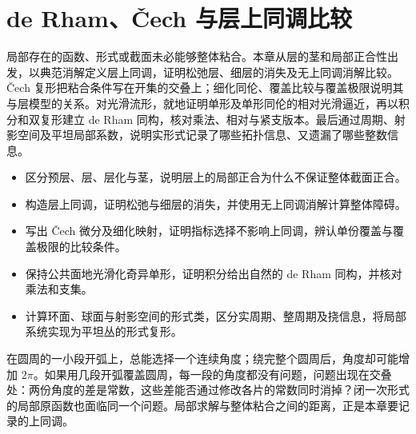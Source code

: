 
% 
% 

\chapter{de Rham、Čech 与层上同调比较}
\label{g2:ch:07}

\begin{chapterabstract}
	局部存在的函数、形式或截面未必能够整体粘合。本章从层的茎和局部正合性出发，以典范消解定义层上同调，证明松弛层、细层的消失及无上同调消解比较。Čech 复形把粘合条件写在开集的交叠上；细化同伦、覆盖比较与覆盖极限说明其与层模型的关系。对光滑流形，就地证明单形及单形同伦的相对光滑逼近，再以积分和双复形建立 de Rham 同构，核对乘法、相对与紧支版本。最后通过周期、射影空间及平坦局部系数，说明实形式记录了哪些拓扑信息、又遗漏了哪些整数信息。
\end{chapterabstract}

\begin{learninggoals}
	\begin{itemize}
		\item 区分预层、层、层化与茎，说明层上的局部正合为什么不保证整体截面正合。
		\item 构造层上同调，证明松弛与细层的消失，并使用无上同调消解计算整体障碍。
		\item 写出 Čech 微分及细化映射，证明指标选择不影响上同调，辨认单份覆盖与覆盖极限的比较条件。
		\item 保持公共面地光滑化奇异单形，证明积分给出自然的 de Rham 同构，并核对乘法和支集。
		\item 计算环面、球面与射影空间的形式类，区分实周期、整周期及挠信息，将局部系统实现为平坦丛的形式复形。
	\end{itemize}
\end{learninggoals}

在圆周的一小段开弧上，总能选择一个连续角度；绕完整个圆周后，角度却可能增加 \(2\pi\)。如果用几段开弧覆盖圆周，每一段的角度都没有问题，问题出现在交叠处：两份角度的差是常数，这些差能否通过修改各片的常数同时消掉？闭一次形式的局部原函数也面临同一个问题。局部求解与整体粘合之间的距离，正是本章要记录的上同调。


